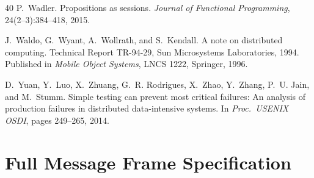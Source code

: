 \documentclass[11pt,a4paper]{article}
\begin{document}
\begin{thebibliography}{40}
P.~Wadler.
\newblock Propositions as sessions.
\newblock \emph{Journal of Functional Programming}, 24(2--3):384--418, 2015.

J.~Waldo, G.~Wyant, A.~Wollrath, and S.~Kendall.
\newblock A note on distributed computing.
\newblock Technical Report TR-94-29, Sun Microsystems Laboratories, 1994.
\newblock Published in \emph{Mobile Object Systems}, LNCS 1222, Springer, 1996.

D.~Yuan, Y.~Luo, X.~Zhuang, G.~R. Rodrigues, X.~Zhao, Y.~Zhang,
  P.~U. Jain, and M.~Stumm.
\newblock Simple testing can prevent most critical failures: An analysis of
  production failures in distributed data-intensive systems.
\newblock In \emph{Proc.\ USENIX OSDI}, pages 249--265, 2014.

\end{thebibliography}

\appendix

\section{Full Message Frame Specification}
\label{app:frame}
\end{document}
